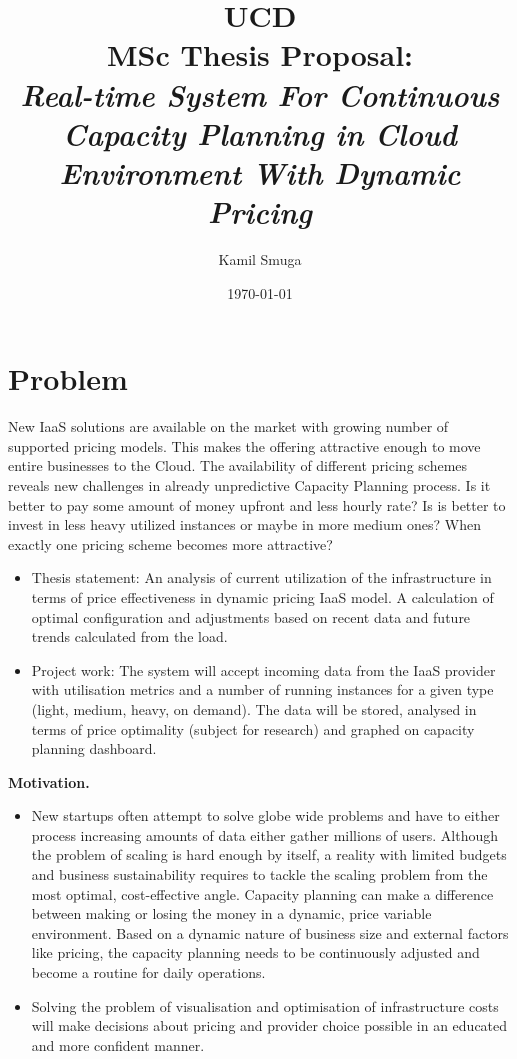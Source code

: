 \documentclass[11pt]{artikel3}
\title{UCD
\\MSc Thesis Proposal:\\\emph{Real-time System For Continuous Capacity Planning in Cloud Environment With Dynamic Pricing}}
\author{Kamil Smuga}
\date{\today}
\begin{document}
\maketitle




\section{Problem}


New IaaS solutions are available on the market with growing number of supported pricing models. This makes the offering attractive enough to move entire businesses to the Cloud. The availability of different pricing schemes reveals new challenges in already unpredictive Capacity Planning process. Is it better to pay some amount of money upfront and less hourly rate? Is is better to invest in less heavy utilized instances or maybe in more medium ones? When exactly one pricing scheme becomes more attractive?


\begin{itemize}
  \item Thesis statement: An analysis of current utilization of the infrastructure in terms of price effectiveness in dynamic pricing IaaS model. A calculation of optimal configuration and adjustments based on recent data and future trends calculated from the load. 
  \item Project work: The system will accept incoming data from the IaaS provider with utilisation metrics and a number of running instances for a given type (light, medium, heavy, on demand). The data will be stored, analysed in terms of price optimality (subject for research) and graphed on capacity planning dashboard.
\end{itemize}




{\bf Motivation.} 
\begin{itemize}
  \item New startups often attempt to solve globe wide problems and have to either process increasing amounts of data either gather millions of users. Although the problem of scaling is hard enough by itself, a reality with limited budgets and business sustainability requires to tackle the scaling problem from the most optimal, cost-effective angle. Capacity planning can make a difference between making or losing the money in a dynamic, price variable environment. Based on a dynamic nature of business size and external factors like pricing, the capacity planning needs to be continuously adjusted and become a routine for daily operations. 
  \item Solving the problem of visualisation and optimisation of infrastructure costs will make decisions about pricing and provider choice possible in an educated and more  confident manner. 
\end{itemize}
\end{document}
